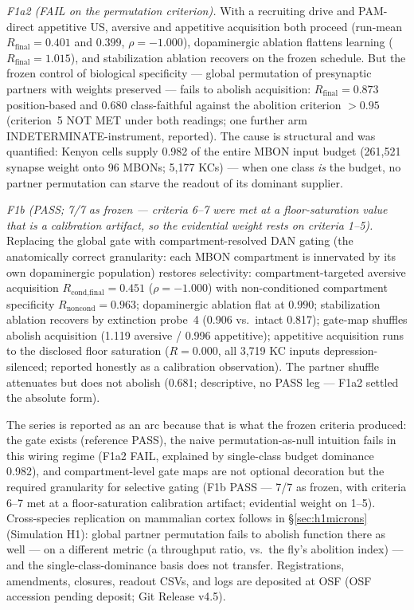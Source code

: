 \documentclass[11pt,twocolumn]{article}
\theoremstyle{plain}
\begin{document}
\textit{F1a2 (FAIL on the permutation criterion).} With a recruiting drive
and PAM-direct appetitive US, aversive and appetitive acquisition both
proceed (run-mean $R_\text{final}=0.401$ and $0.399$,
$\rho=-1.000$), dopaminergic ablation flattens learning
($R_\text{final}=1.015$), and stabilization ablation recovers on the
frozen schedule. But the frozen control of biological specificity ---
global permutation of presynaptic partners with weights preserved ---
fails to abolish acquisition: $R_\text{final}=0.873$ position-based and
$0.680$ class-faithful against the abolition criterion $>0.95$
(criterion~5 NOT MET under both readings; one further arm
INDETERMINATE-instrument, reported). The cause is structural and was
quantified: Kenyon cells supply 0.982 of the entire MBON input budget
(261{,}521 synapse weight onto 96 MBONs; 5{,}177 KCs) --- when one class
\emph{is} the budget, no partner permutation can starve the readout of
its dominant supplier.

\textit{F1b (PASS; 7/7 as frozen --- criteria 6--7 were met at a floor-saturation value that is a calibration artifact, so the evidential weight rests on criteria 1--5).} Replacing the global gate with
compartment-resolved DAN gating (the anatomically correct granularity:
each MBON compartment is innervated by its own dopaminergic population)
restores selectivity: compartment-targeted aversive acquisition
$R_\text{cond,final}=0.451$ ($\rho=-1.000$) with non-conditioned
compartment specificity $R_\text{noncond}=0.963$; dopaminergic ablation
flat at $0.990$; stabilization ablation recovers by extinction probe~4
(0.906 vs.\ intact 0.817); gate-map shuffles abolish acquisition (1.119 aversive /
0.996 appetitive); appetitive acquisition runs to the disclosed floor
saturation ($R=0.000$, all 3{,}719 KC inputs depression-silenced; reported
honestly as a calibration observation). The partner shuffle attenuates
but does not abolish (0.681; descriptive, no PASS leg --- F1a2 settled
the absolute form).

The series is reported as an arc because that is what the frozen criteria
produced: the gate exists (reference PASS), the naive
permutation-as-null intuition fails in this wiring regime (F1a2 FAIL,
explained by single-class budget dominance 0.982), and compartment-level
gate maps are not optional decoration but the required granularity for
selective gating (F1b PASS --- 7/7 as frozen, with criteria 6--7 met at a
floor-saturation calibration artifact; evidential weight on 1--5).
Cross-species replication on mammalian cortex follows in
\S\ref{sec:h1microns} (Simulation H1): global partner permutation fails
to abolish function there as well --- on a different metric (a throughput
ratio, vs.\ the fly's abolition index) --- and the
single-class-dominance basis does not transfer.
Registrations, amendments, closures, readout CSVs, and logs are deposited
at OSF (OSF accession pending deposit; Git Release v4.5).
\end{document}

